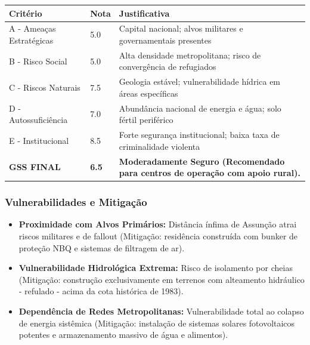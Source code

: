 \begin{table}[ht!]
\small \begin{tabular}{p{3.0cm}p{0.8cm}p{6.0cm}} \toprule
\textbf{Critério} & \textbf{Nota} & \textbf{Justificativa} \\ \midrule
A - Ameaças Estratégicas & 5.0 & Capital nacional; alvos militares e governamentais presentes \\
B - Risco Social & 5.0 & Alta densidade metropolitana; risco de convergência de refugiados \\
C - Riscos Naturais & 7.5 & Geologia estável; vulnerabilidade hídrica em áreas específicas \\
D - Autossuficiência & 7.0 & Abundância nacional de energia e água; solo fértil periférico \\
E - Institucional & 8.5 & Forte segurança institucional; baixa taxa de criminalidade violenta \\
\midrule \textbf{GSS FINAL} & \textbf{6.5} & \textbf{Moderadamente Seguro (Recomendado para centros de operação com apoio rural).} \\ \bottomrule \end{tabular}
\end{table}
\subsubsection{Vulnerabilidades e
Mitigação}

\begin{itemize}
\tightlist
\item
  \textbf{Proximidade com Alvos Primários:} Distância ínfima de Assunção
  atrai riscos militares e de fallout (Mitigação: residência construída
  com bunker de proteção NBQ e sistemas de filtragem de ar).
\item
  \textbf{Vulnerabilidade Hidrológica Extrema:} Risco de isolamento por
  cheias (Mitigação: construção exclusivamente em terrenos com
  alteamento hidráulico - refulado - acima da cota histórica de 1983).
\item
  \textbf{Dependência de Redes Metropolitanas:} Vulnerabilidade total ao
  colapso de energia sistêmica (Mitigação: instalação de sistemas
  solares fotovoltaicos potentes e armazenamento massivo de água e
  alimentos).
\end{itemize}

